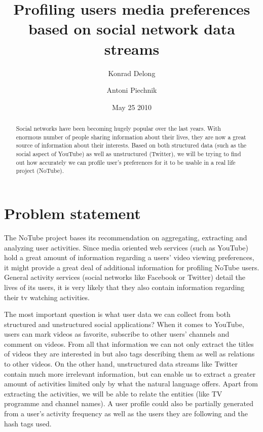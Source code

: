 \documentclass{article}
\begin{document}
\title{Profiling users media preferences based on social network data streams}
\author{Konrad Delong \and Antoni Piechnik}
\date{May 25 2010}

\maketitle

\begin{abstract} Social networks have been becoming hugely popular over the last
years. With enormous number of people sharing information about their lives,
they are now a great source of information about their interests. Based on both
structured data (such as the social aspect of YouTube) as well as unstructured
(Twitter), we will be trying to find out how accurately we can profile user's
preferences for it to be usable in a real life project (NoTube).
\end{abstract}

\section{Problem statement}
The NoTube project bases its recommendation on aggregating, extracting and analyzing user activities. Since media oriented web services (such as YouTube) hold a great amount of information regarding a users' video viewing preferences, it might provide a great deal of additional information for profiling NoTube users. General activity services (social networks like Facebook or Twitter) detail the lives of its users, it is very likely that they also contain information regarding their tv watching activities.

The most important question is what user data we can collect from both structured and unstructured social applications? When it comes to YouTube, users can mark videos as favorite, subscribe to other users' channels and comment on videos. From all that information we can not only extract the titles of videos they are interested in but also tags describing them as well as relations to other videos. On the other hand, unstructured data streams like Twitter contain much more irrelevant information, but can enable us to extract a greater amount of activities limited only by what the natural language offers. Apart from extracting the activities, we will be able to relate the entities (like TV programme and channel names). A user profile could also be partially generated from a user's activity frequency as well as the users they are following and the hash tags used.
\end{document}
